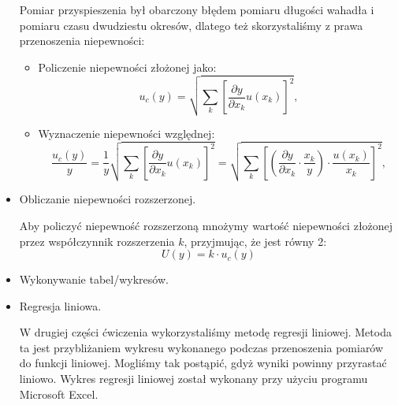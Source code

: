 \documentclass [a4paper,11pt]{article}
\begin{document}
\begin{itemize}
		Pomiar przyspieszenia był obarczony błędem pomiaru długości wahadła i pomiaru czasu dwudziestu okresów, dlatego też skorzystaliśmy z prawa przenoszenia niepewności:
		\begin{itemize}
			\item Policzenie niepewności złożonej jako:
			\begin{equation}
			\label{eq:wstepprzenoszenie1}
			u_c(y) = \sqrt{\sum_k \left[ \frac{\partial y}{\partial x_k}u(x_k) \right]^2}\text{,}
			\end{equation}
			\item Wyznaczenie niepewności względnej: 
			\begin{equation}
			\label{eq:wstepprzenoszenie2}
			\frac{u_c(y)}{y} = \frac{1}{y}\sqrt{\sum_k \left[ \frac{\partial y}{\partial x_k}u(x_k) \right]^2} = \sqrt{\sum_k \left[ \left( \frac{\partial y}{\partial x_k}\cdot \frac{x_k}{y} \right)\cdot \frac{u(x_k)}{x_k} \right]^2}\text{,}
			\end{equation}
		\end{itemize}
		
		\item Obliczanie niepewności rozszerzonej.
		
		Aby policzyć niepewność rozszerzoną mnożymy wartość niepewności złożonej przez współczynnik rozszerzenia $k$, przyjmując, że jest równy 2:
		\begin{equation}
		\label{eq:wsteprozszerzona}
		U(y) = k \cdot u_c(y)
		\end{equation}
		
		\item Wykonywanie tabel/wykresów.
		\item Regresja liniowa.
		
		W drugiej części ćwiczenia wykorzystaliśmy metodę regresji liniowej. Metoda ta jest przybliżaniem wykresu wykonanego podczas przenoszenia pomiarów do funkcji liniowej. Mogliśmy tak postąpić, gdyż wyniki powinny przyrastać liniowo. Wykres regresji liniowej został wykonany przy użyciu programu Microsoft Excel. 
		
	\end{itemize}
	\newpage
\end{document}
